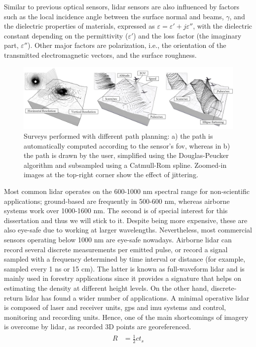 Similar to previous optical sensors, \acrshort{lidar} sensors are also influenced by factors such as the local incidence angle between the surface normal and beams, $\gamma$, and the dielectric properties of materials, expressed as $\varepsilon = \varepsilon' + j\varepsilon''$, with the dielectric constant depending on the permittivity ($\varepsilon'$) and the loss factor (the imaginary part, $\varepsilon''$). Other major factors are polarization, i.e., the orientation of the transmitted electromagnetic vectors, and the surface roughness.

\begin{figure}[ht]
	\includegraphics[width=\linewidth]{figs/fundamentals/lidar_patterns.png}
	\caption{Surveys performed with different path planning: a) the path is automatically computed according to the sensor's \acrshort{fov}, whereas in b) the path is drawn by the user, simplified using the Douglas-Peucker algorithm and subsampled using a Catmull-Rom spline. Zoomed-in images at the top-right corner show the effect of jittering. }
    \label{fig:lidar_patterns}
\end{figure}

Most common \acrshort{lidar} operates on the 600-1000 \si{\nano\meter} spectral range for non-scientific applications; ground-based are frequently in 500-600 \si{\nano\meter}, whereas airborne systems work over 1000-1600 \si{\nano\meter}. The second is of special interest for this dissertation and thus we will stick to it. Despite being more expensive, these are also eye-safe due to working at larger wavelengths. Nevertheless, most commercial sensors operating below 1000 \si{\nano\meter} are eye-safe nowadays. Airborne \acrshort{lidar} can record several discrete measurements per emitted pulse, or record a signal sampled with a frequency determined by time interval or distance (for example, sampled every 1 \si{\nano\second} or 15 \si{\centi\meter}). The latter is known as full-waveform \acrshort{lidar} and is mainly used in forestry applications since it provides a signature that helps on estimating the density at different height levels. On the other hand, discrete-return \acrshort{lidar} has found a wider number of applications. A minimal operative \acrshort{lidar} is composed of laser and receiver units, \acrshort{gps} and \acrshort{imu} systems and control, monitoring and recording units. Hence, one of the main shortcomings of imagery is overcome by \acrshort{lidar}, as recorded 3D points are georeferenced. 
\begin{gather}
    \label{eq:lidar_distance}
    \begin{aligned}
        R &= \frac{1}{2}ct_s
    \end{aligned}
\end{gather}

